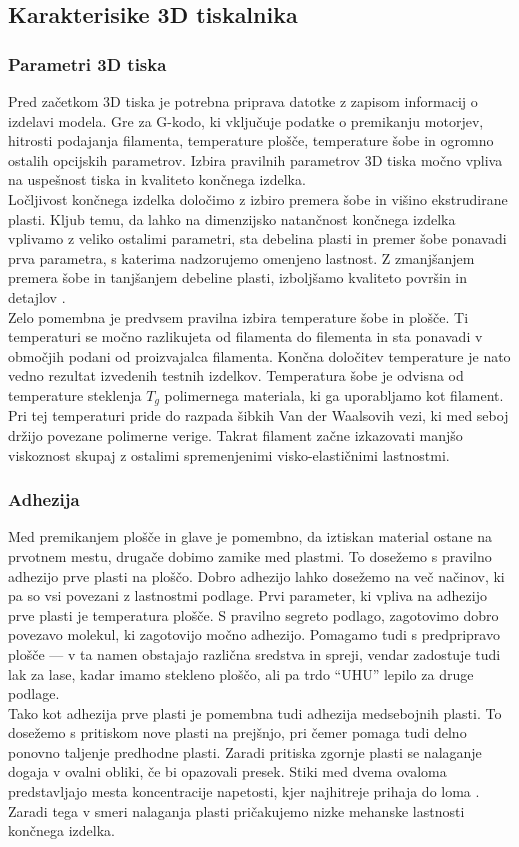 \documentclass[12pt]{report}
\begin{document}
\subsection{Karakterisike 3D tiskalnika}
\subsubsection{Parametri 3D tiska}
Pred začetkom 3D tiska je potrebna priprava datotke z zapisom informacij o izdelavi modela. Gre za G-kodo, ki vključuje podatke o premikanju motorjev, hitrosti podajanja filamenta, temperature plošče, temperature šobe in ogromno ostalih opcijskih parametrov.
Izbira pravilnih parametrov 3D tiska močno vpliva na uspešnost tiska in kvaliteto končnega izdelka. \\
Ločljivost končnega izdelka določimo z izbiro premera šobe in višino ekstrudirane plasti. Kljub temu, da lahko na dimenzijsko natančnost končnega izdelka vplivamo z veliko ostalimi parametri, sta debelina plasti in premer šobe ponavadi prva parametra, s katerima nadzorujemo
omenjeno lastnost. Z zmanjšanjem premera šobe in tanjšanjem debeline plasti, izboljšamo kvaliteto površin in detajlov \cite{redwood20173d}.
\\
Zelo pomembna je predvsem pravilna izbira temperature šobe in plošče. Ti temperaturi se močno razlikujeta od filamenta do filementa in sta ponavadi v območjih podani od proizvajalca filamenta. Končna določitev temperature je nato vedno rezultat 
izvedenih testnih izdelkov. Temperatura šobe je odvisna od temperature steklenja $T_g$ polimernega materiala, ki ga uporabljamo kot filament. Pri tej temperaturi pride do razpada šibkih Van der Waalsovih vezi, ki med seboj držijo povezane polimerne verige. Takrat filament začne izkazovati
manjšo viskoznost skupaj z ostalimi spremenjenimi visko-elastičnimi lastnostmi.

\subsubsection{Adhezija}
Med premikanjem plošče in glave je pomembno, da iztiskan material ostane na prvotnem mestu, drugače dobimo zamike med plastmi. To dosežemo s pravilno adhezijo prve plasti na ploščo. Dobro adhezijo lahko dosežemo na več načinov, ki pa so vsi povezani z lastnostmi podlage.
Prvi parameter, ki vpliva na adhezijo prve plasti je temperatura plošče. S pravilno segreto podlago, zagotovimo dobro povezavo molekul, ki zagotovijo močno adhezijo. Pomagamo tudi s predpripravo plošče --- v ta namen obstajajo
različna sredstva in spreji, vendar zadostuje tudi lak za lase, kadar imamo stekleno ploščo, ali pa trdo ``UHU'' lepilo za druge podlage. \\
Tako kot adhezija prve plasti je pomembna tudi adhezija medsebojnih plasti. To dosežemo s pritiskom nove plasti na prejšnjo, pri čemer pomaga tudi delno ponovno taljenje predhodne plasti. Zaradi pritiska zgornje plasti se nalaganje dogaja v ovalni obliki, če bi opazovali presek. Stiki med dvema ovaloma predstavljajo mesta koncentracije napetosti, kjer najhitreje prihaja do loma \cite{redwood20173d}. Zaradi tega v smeri nalaganja plasti pričakujemo 
nizke mehanske lastnosti končnega izdelka.
\end{document}
